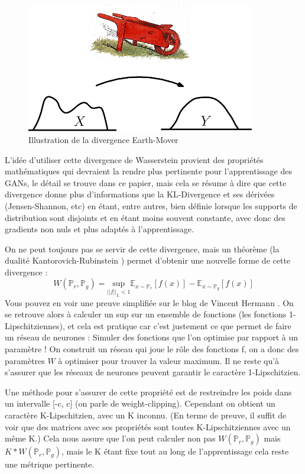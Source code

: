 \begin{figure}[ht!]
  \centering
    \includegraphics[width=10cm]{fig/Earth_mover_distance}
    \caption{Illustration de la divergence Earth-Mover}
    \label{fig:E-M_distance}
\end{figure}


L'idée d'utiliser cette divergence de Wasserstein provient des propriétés mathématiques qui devraient la rendre plus pertinente pour l'apprentissage des GANs, le détail se trouve dans ce papier, mais cela se résume à dire que cette divergence donne plus d'informations que la KL-Divergence et ses dérivées (Jensen-Shannon, etc) en étant, entre autres, bien définie lorsque les supports de distribution sont disjoints et en étant moins souvent constante, avec donc des gradients non nuls et plus adaptés à l'apprentissage.

On ne peut toujours pas se servir de cette divergence, mais un théorème (la dualité Kantorovich-Rubinstein \cite{optimal-transport}) permet d'obtenir une nouvelle forme de cette divergence :
\[
W(\mathbb{P}_r, \mathbb{P}_g) = \underset{||f||_L<1}{\text{sup}}\mathbb{E}_{x\sim\mathbb{P}_r}\left[f(x)\right] - \mathbb{E}_{x\sim\mathbb{P}_g}\left[f(x)\right]
\]
Vous pouvez en voir une preuve simplifiée sur le blog de Vincent Hermann \cite{preuve-wgan}.
On se retrouve alors à calculer un sup sur un ensemble de fonctions (les fonctions 1-Lipschitziennes), et cela est pratique car c'est justement ce que permet de faire un réseau de neurones : Simuler des fonctions que l'on optimise par rapport à un paramètre ! On construit un réseau qui joue le rôle des fonctions f, on a donc des paramètres $W$ à optimiser pour trouver la valeur maximum. Il ne reste qu'à s'assurer que les réseaux de neurones peuvent garantir le caractère 1-Lipschitzien.

Une méthode pour s'assurer de cette propriété est de restreindre les poids dans un intervalle [-c, c] (on parle de weight-clipping). Cependant on obtient un caractère K-Lipschitzien, avec un K inconnu. (En terme de preuve, il suffit de voir que des matrices avec ses propriétés sont toutes K-Lipschitziennes avec un même K.) Cela nous assure que l'on peut calculer non pas $W(\mathbb{P}_r, \mathbb{P}_g)$ mais $K*W(\mathbb{P}_r, \mathbb{P}_g)$, mais le K étant fixe tout au long de l'apprentissage cela reste une métrique pertinente. 


